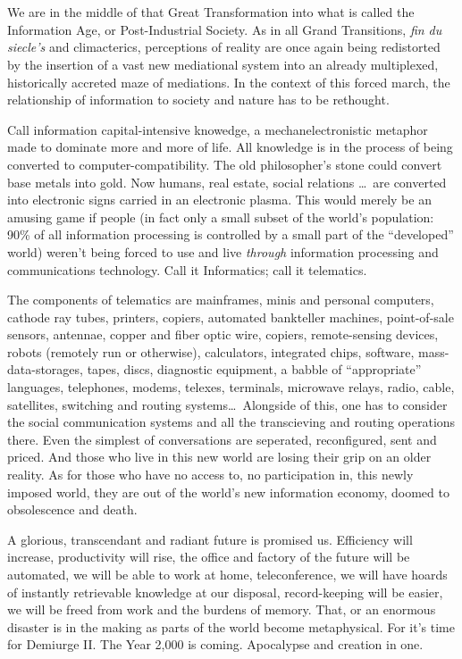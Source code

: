 \chapter{}

We are in the middle of that Great Transformation into what is called the Information Age, or Post-Industrial Society. As in all Grand Transitions, \emph{fin du siecle's} and climacterics, perceptions of reality are once again being redistorted by the insertion of a vast new mediational system into an already multiplexed, historically accreted maze of mediations. In the context of this forced march, the relationship of information to society and nature has to be rethought.

Call information capital-intensive knowedge, a mechanelectronistic metaphor made to dominate more and more of life. All knowledge is in the process of being converted to computer-compatibility. The old philosopher's stone could convert base metals into gold. Now humans, real estate, social relations \ldots\ are converted into electronic signs carried in an electronic plasma. This would merely be an amusing game if people (in fact only a small subset of the world's population: 90\% of all information processing is controlled by a small part of the \enquote{developed} world) weren't being forced to use and live \emph{through} information processing and communications technology. Call it Informatics; call it telematics.

The components of telematics are mainframes, minis and personal computers, cathode ray tubes, printers, copiers, automated bankteller machines, point-of-sale sensors, antennae, copper and fiber optic wire, copiers, remote-sensing devices, robots (remotely run or otherwise), calculators, integrated chips, software, mass-data-storages, tapes, discs, diagnostic equipment, a babble of \enquote{appropriate} languages, telephones, modems, telexes, terminals, microwave relays, radio, cable, satellites, switching and routing systems\ldots\ Alongside of this, one has to consider the social communication systems and all the transcieving and routing operations there. Even the simplest of conversations are seperated, reconfigured, sent and priced. And those who live in this new world are losing their grip on an older reality. As for those who have no access to, no participation in, this newly imposed world, they are out of the world's new information economy, doomed to obsolescence and death.

A glorious, transcendant and radiant future is promised us. Efficiency will increase, productivity will rise, the office and factory of the future will be automated, we will be able to work at home, teleconference, we will have hoards of instantly retrievable knowledge at our disposal, record-keeping will be easier, we will be freed from work and the burdens of memory. That, or an enormous disaster is in the making as parts of the world become metaphysical. For it's time for Demiurge II. The Year 2,000 is coming. Apocalypse and creation in one.


